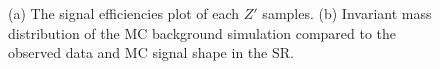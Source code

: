 \begin{figure}[hbtp]
  \centering
  \hspace{0.5cm}
  \caption{\label{fig:SIG_eff_spectrum}(a) The signal efficiencies plot of each $Z'$ samples. (b) Invariant mass distribution of the MC background simulation compared to the observed data and MC signal shape in the SR.}
\end{figure}

